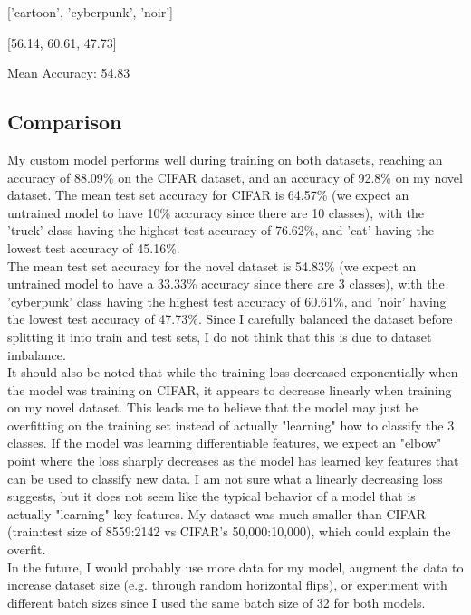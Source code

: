\documentclass[11pt]{article}
\begin{document}
{[}'cartoon', 'cyberpunk', 'noir'{]}

{[}56.14, 60.61, 47.73{]}

Mean Accuracy: 54.83

\subsection{Comparison}\label{comparison}

My custom model performs well during training on both datasets, reaching
an accuracy of 88.09\% on the CIFAR dataset, and an accuracy of 92.8\%
on my novel dataset. The mean test set accuracy for CIFAR is 64.57\% (we
expect an untrained model to have 10\% accuracy since there are 10
classes), with the 'truck' class having the highest test accuracy of
76.62\%, and 'cat' having the lowest test accuracy of 45.16\%.\\

The mean test set accuracy for the novel dataset is 54.83\% (we expect
an untrained model to have a 33.33\% accuracy since there are 3
classes), with the 'cyberpunk' class having the highest test accuracy of
60.61\%, and 'noir' having the lowest test accuracy of 47.73\%. Since I
carefully balanced the dataset before splitting it into train and test
sets, I do not think that this is due to dataset imbalance.\\

It should also be noted that while the training loss decreased
exponentially when the model was training on CIFAR, it appears to
decrease linearly when training on my novel dataset. This leads me to
believe that the model may just be overfitting on the training set
instead of actually "learning" how to classify the 3 classes. If the
model was learning differentiable features, we expect an "elbow" point
where the loss sharply decreases as the model has learned key features
that can be used to classify new data. I am not sure what a linearly
decreasing loss suggests, but it does not seem like the typical behavior
of a model that is actually "learning" key features. My dataset was much
smaller than CIFAR (train:test size of 8559:2142 vs CIFAR's
50,000:10,000), which could explain the overfit.\\

In the future, I would probably use more data for my model, augment the
data to increase dataset size (e.g. through random horizontal flips), or
experiment with different batch sizes since I used the same batch size
of 32 for both models.
\end{document}
